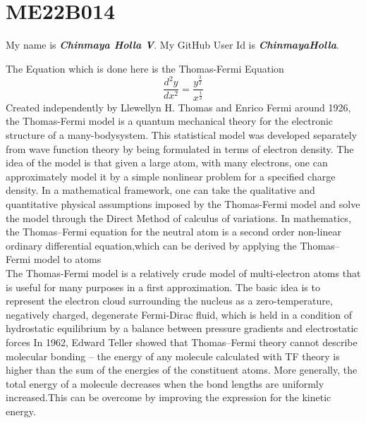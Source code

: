 %
\section{ME22B014}
My name is  \textbf{\textit{Chinmaya Holla V}}.\newline
My GitHub User Id is \textbf{\textit{ChinmayaHolla}}.
\newline

The Equation which is done here is the Thomas-Fermi Equation
\begin{equation}
\frac{d^2y}{dx^2} = \frac{y^\frac{3}{2}}{x^\frac{1}{2}}
\end{equation}
\newline
\newline
Created independently by Llewellyn H. Thomas and Enrico Fermi around 1926, the Thomas-Fermi model is a quantum mechanical theory for the electronic structure of a many-bodysystem. This statistical model was developed separately from wave function theory by being formulated in terms of electron density. The idea of the model is that given a large atom, with many electrons, one can approximately model it by a simple nonlinear problem for a specified charge density. In a mathematical framework, one can take the qualitative and quantitative physical assumptions imposed by the Thomas-Fermi model and solve the model through the Direct Method of calculus of variations. In mathematics, the Thomas–Fermi equation for the neutral atom is a second order non-linear ordinary differential equation,which can be derived by applying the Thomas–Fermi model to atoms
\newline
\\
The Thomas-Fermi model is a relatively crude model of multi-electron atoms that is useful for many purposes in a first approximation. The basic idea is to represent the electron cloud surrounding the nucleus as a zero-temperature, negatively charged, degenerate Fermi-Dirac fluid, which is held in a condition of hydrostatic equilibrium by a balance between pressure gradients and electrostatic forces
\newline
In 1962, Edward Teller showed that Thomas–Fermi theory cannot describe molecular bonding – the energy of any molecule calculated with TF theory is higher than the sum of the energies of the constituent atoms. More generally, the total energy of a molecule decreases when the bond lengths are uniformly increased.This can be overcome by improving the expression for the kinetic energy.

